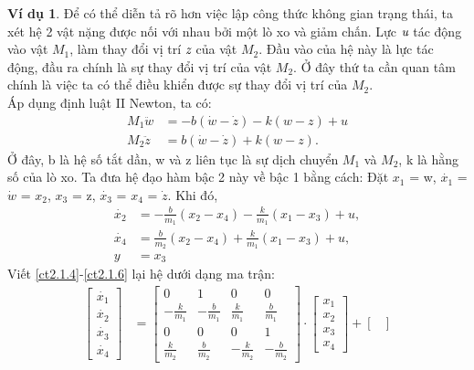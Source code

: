 \documentclass[12pt,a4paper]{article}
\theoremstyle{definition}
\newtheorem{example}[theorem]{Ví dụ}
\begin{document}
\begin{example}
Để có thể diễn tả rõ hơn việc lập công thức không gian trạng thái, ta xét hệ 2 vật nặng được nối với nhau bởi một lò xo và giảm chấn. Lực $\emph{u}$ tác động vào vật $M_1$, làm thay đổi vị trí $\emph{z}$ của vật $M_2$. Đầu vào của hệ này là lực tác động, đầu ra chính là sự thay đổi vị trí của vật $M_2$. Ở đây thứ ta cần quan tâm chính là việc ta có thể điều khiển được sự thay đổi vị trí của $M_2$.\\
Áp dụng định luật II Newton, ta có:
\begin{align}
    M_1\ddot{w} &= -b(\dot{w} - \dot{z}) - k(w - z) + u \\
    M_2\ddot{z} &= b(\dot{w} - \dot{z}) + k(w - z).
\end{align}
Ở đây, b là hệ số tắt dần, w và z liên tục là sự dịch chuyển  $M_1$ và $M_2$, k là hằng số của lò xo. Ta đưa hệ đạo hàm bậc 2 này về bậc 1 bằng cách:
Đặt $x_1$ = w, $\dot{x_1}$ = $\dot{w}$ = $x_2$, $x_3$ = z, $\dot{x_3}$ = $x_4$ = $\dot{z}$. Khi đó,
\begin{align}
\dot{x_2} &= -\frac{b}{m_1}(x_2 - x_4) - \frac{k}{m_1}(x_1 - x_3) + u \label{ct2.1.4},  \\
\dot{x_4} &= \frac{b}{m_2}(x_2 - x_4) + \frac{k}{m_1}(x_1 - x_3) + u, \\
y &= x_3 \label{ct2.1.6}
\end{align}
Viết \eqref{ct2.1.4}-\eqref{ct2.1.6} lại hệ dưới dạng ma trận:
\begin{align}
    \begin{bmatrix}
        \dot{x_1}\\ \dot{x_2}\\ \dot{x_3}\\ \dot{x_4}
    \end{bmatrix}
     &= 
    \begin{bmatrix}
     0 & 1 & 0 & 0\\
     -\frac{k}{m_1} & -\frac{b}{m_1} & \frac{k}{m_1} & \frac{b}{m_1}\\
     0 & 0 & 0 & 1\\
     \frac{k}{m_2} & \frac{b}{m_2} & -\frac{k}{m_2} & -\frac{b}{m_2}
     \end{bmatrix}
     \cdot
     \begin{bmatrix}
     x_1 \\ x_2 \\ x_3 \\ x_4
     \end{bmatrix}
     + 
     \begin{bmatrix}

\end{bmatrix}
\end{align}
\end{example}
\end{document}
